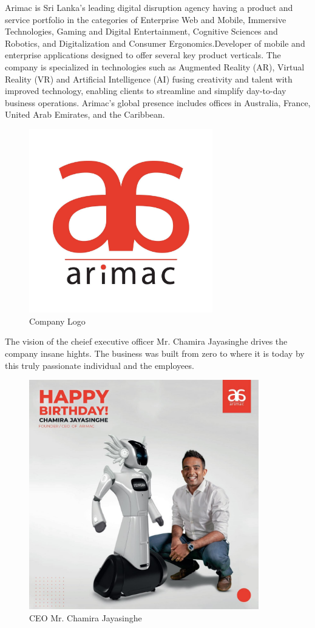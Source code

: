 \documentclass[twoside,12pt,times,onecolumn,a4paper]{report}
\begin{document}
\hspace{3em} Arimac is Sri Lanka’s leading digital disruption agency having a product and service portfolio in the categories of Enterprise Web and Mobile, Immersive Technologies, Gaming and Digital Entertainment, Cognitive Sciences and Robotics, and Digitalization and Consumer Ergonomics.Developer of mobile and enterprise applications designed to offer several key product verticals. The company is specialized in technologies such as Augmented Reality (AR), Virtual Reality (VR) and Artificial Intelligence (AI) fusing creativity and talent with improved technology, enabling clients to streamline and simplify day-to-day business operations. Arimac’s global presence includes offices in Australia, France, United Arab Emirates, and the Caribbean.

\begin{figure}[!h]
  \centering
   \includegraphics[width=8cm]{logo}
  \caption{Company Logo}
\end{figure}

The vision of the cheief executive officer Mr. Chamira Jayasinghe drives the company insane hights. The business was built from zero to where it is today by this truly passionate individual and the employees. 

\begin{figure}[!h]
  \centering
   \includegraphics[width=10cm]{ceo}
  \caption{CEO Mr. Chamira Jayasinghe}
\end{figure}
\end{document}
